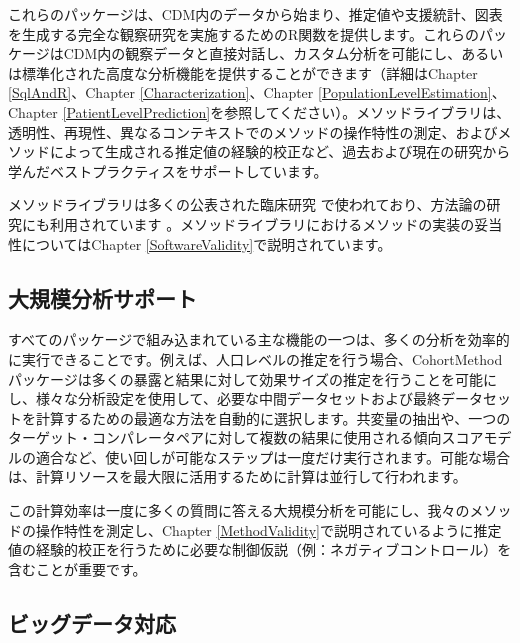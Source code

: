 \documentclass[
  11pt]{book}
\theoremstyle{definition}
\theoremstyle{definition}
\theoremstyle{definition}
\theoremstyle{definition}
\theoremstyle{remark}
\begin{document}
これらのパッケージは、CDM内のデータから始まり、推定値や支援統計、図表を生成する完全な観察研究を実施するためのR関数を提供します。これらのパッケージはCDM内の観察データと直接対話し、カスタム分析を可能にし、あるいは標準化された高度な分析機能を提供することができます（詳細はChapter \ref{SqlAndR}、Chapter \ref{Characterization}、Chapter \ref{PopulationLevelEstimation}、Chapter \ref{PatientLevelPrediction}を参照してください）。メソッドライブラリは、透明性、再現性、異なるコンテキストでのメソッドの操作特性の測定、およびメソッドによって生成される推定値の経験的校正など、過去および現在の研究から学んだベストプラクティスをサポートしています。

メソッドライブラリは多くの公表された臨床研究 \citep{boland_2017, duke_2017, ramcharran_2017, weinstein_2017, wang_2017, ryan_2017, ryan_2018, vashisht_2018, yuan_2018, johnston_2019} で使われており、方法論の研究にも利用されています \citep{schuemie_2014, schuemie_2016, reps2018, tian_2018, schuemie_2018, schuemie_2018b, reps_2019}。メソッドライブラリにおけるメソッドの実装の妥当性についてはChapter \ref{SoftwareValidity}で説明されています。

\subsection{大規模分析サポート}\label{ux5927ux898fux6a21ux5206ux6790ux30b5ux30ddux30fcux30c8}

すべてのパッケージで組み込まれている主な機能の一つは、多くの分析を効率的に実行できることです。例えば、人口レベルの推定を行う場合、CohortMethodパッケージは多くの暴露と結果に対して効果サイズの推定を行うことを可能にし、様々な分析設定を使用して、必要な中間データセットおよび最終データセットを計算するための最適な方法を自動的に選択します。共変量の抽出や、一つのターゲット・コンパレータペアに対して複数の結果に使用される傾向スコアモデルの適合など、使い回しが可能なステップは一度だけ実行されます。可能な場合は、計算リソースを最大限に活用するために計算は並行して行われます。

この計算効率は一度に多くの質問に答える大規模分析を可能にし、我々のメソッドの操作特性を測定し、Chapter \ref{MethodValidity}で説明されているように推定値の経験的校正を行うために必要な制御仮説（例：ネガティブコントロール）を含むことが重要です。 

\subsection{ビッグデータ対応}\label{BigDataSupport}
\end{document}
